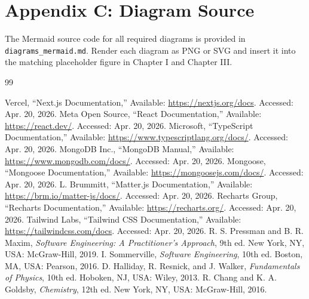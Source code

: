 \documentclass[12pt,a4paper]{report}
\begin{document}
\chapter{Appendix C: Diagram Source}
The Mermaid source code for all required diagrams is provided in \texttt{diagrams\_mermaid.md}. Render each diagram as PNG or SVG and insert it into the matching placeholder figure in Chapter I and Chapter III.

\begin{thebibliography}{99}
 Vercel, ``Next.js Documentation,'' Available: \url{https://nextjs.org/docs}. Accessed: Apr. 20, 2026.
 Meta Open Source, ``React Documentation,'' Available: \url{https://react.dev/}. Accessed: Apr. 20, 2026.
 Microsoft, ``TypeScript Documentation,'' Available: \url{https://www.typescriptlang.org/docs/}. Accessed: Apr. 20, 2026.
 MongoDB Inc., ``MongoDB Manual,'' Available: \url{https://www.mongodb.com/docs/}. Accessed: Apr. 20, 2026.
 Mongoose, ``Mongoose Documentation,'' Available: \url{https://mongoosejs.com/docs/}. Accessed: Apr. 20, 2026.
 L. Brummitt, ``Matter.js Documentation,'' Available: \url{https://brm.io/matter-js/docs/}. Accessed: Apr. 20, 2026.
 Recharts Group, ``Recharts Documentation,'' Available: \url{https://recharts.org/}. Accessed: Apr. 20, 2026.
 Tailwind Labs, ``Tailwind CSS Documentation,'' Available: \url{https://tailwindcss.com/docs}. Accessed: Apr. 20, 2026.
 R. S. Pressman and B. R. Maxim, \textit{Software Engineering: A Practitioner's Approach}, 9th ed. New York, NY, USA: McGraw-Hill, 2019.
 I. Sommerville, \textit{Software Engineering}, 10th ed. Boston, MA, USA: Pearson, 2016.
 D. Halliday, R. Resnick, and J. Walker, \textit{Fundamentals of Physics}, 10th ed. Hoboken, NJ, USA: Wiley, 2013.
 R. Chang and K. A. Goldsby, \textit{Chemistry}, 12th ed. New York, NY, USA: McGraw-Hill, 2016.
\end{thebibliography}
\end{document}
